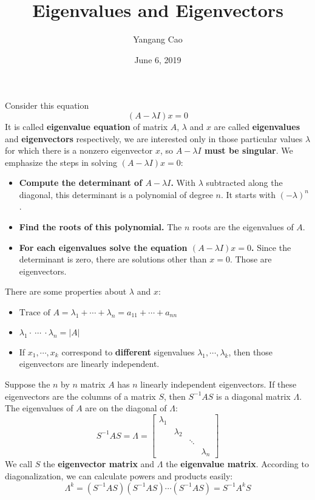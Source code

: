 \documentclass[10pt,a4paper,oneside]{article}
\author{Yangang Cao}
\date{June 6, 2019}
\begin{document}
\title{Eigenvalues and Eigenvectors}
\maketitle
Consider this equation
\[
(A-\lambda I)x=0
\]
It is called {\bfseries eigenvalue equation} of matrix $A$, $\lambda$ and $x$ are called {\bfseries eigenvalues} and {\bfseries eigenvectors} respectively, we are interested only in those particular values $\lambda$ for which there is a nonzero eigenvector $x$, so {\bfseries$A-\lambda I$ must be singular}. We emphasize the steps in solving $(A-\lambda I)x=0$:
\begin{itemize}
\item {\bfseries Compute the determinant of $A-\lambda I$.} With $\lambda$ subtracted along the diagonal, this determinant is a polynomial of degree $n$. It starts with $(-\lambda)^n$.
\item {\bfseries Find the roots of this polynomial.} The $n$ roots are the eigenvalues of $A$.
\item {\bfseries For each eigenvalues solve the equation $(A-\lambda I)x=0$.} Since the determinant is zero, there are solutions other than $x=0$. Those are eigenvectors.
\end{itemize}
There are some properties about $\lambda$ and $x$:
\begin{itemize}
\item$
\text{Trace of $A$} = \lambda_1+\cdots+\lambda_n=a_{11}+\cdots+a_{nn}
$
\item$
\lambda_1\cdot \  \cdots \ \cdot\lambda_n= |A|
$
\item If $x_1,\cdots,x_k$ correspond to {\bfseries different} sigenvalues $\lambda_{1},\cdots,\lambda_{k}$, then those eigenvectors are linearly independent.
\end{itemize}

Suppose the $n$ by $n$ matrix $A$ has $n$ linearly independent eigenvectors. If these eigenvectors are the columns of a matrix $S$, then $S^{-1}AS$ is a diagonal matrix $\Lambda$. The eigenvalues of $A$ are on the diagonal of $\Lambda$: 
\[
S^{-1} A S=\Lambda=\left[\begin{array}{cccc}{\lambda_{1}} & {} & { } & {} \\ { } & {\lambda_{2}} & {} & {} \\ {} & {} & {\ddots} & { } \\ { } & { } & { } & {\lambda_{n}}\end{array}\right]
\]
We call $S$ the {\bfseries eigenvector matrix} and $\Lambda$ the {\bfseries eigenvalue matrix}. According to diagonalization, we can calculate powers and products easily:
\[
\Lambda^k=(S^{-1}AS)(S^{-1}AS)\cdots(S^{-1}AS)=S^{-1}A^kS
\]
\end{document}
